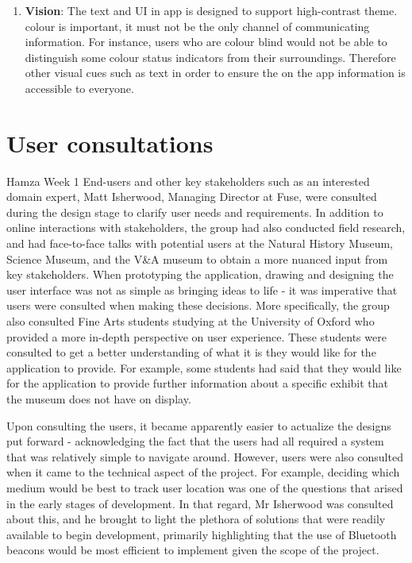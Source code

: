 \begin{enumerate}
	\item \textbf{Vision}: The text and UI in  app is designed to support high-contrast theme.   colour is important, it must not be the only channel of communicating information. For instance, users who are colour blind would not be able to distinguish some colour status indicators from their surroundings. Therefore  other visual cues such as text  in order to ensure the on the app information is accessible to everyone. 
    
\end{enumerate}

\section{User consultations}
Hamza Week 1
End-users and other key stakeholders such as an interested domain expert, Matt Isherwood, Managing Director at Fuse\textsuperscript{\textcopyright}, were consulted during the design stage to clarify user needs and requirements. In addition to online interactions with stakeholders, the group had also conducted field research, and had face-to-face talks with potential users at the Natural History Museum, Science Museum, and the V\&A museum to obtain a more nuanced input from key stakeholders. When prototyping the application, drawing and designing the user interface was not as simple as bringing ideas to life - it was imperative that users were consulted when making these decisions. More specifically, the group also consulted Fine Arts students studying at the University of Oxford who provided a more in-depth perspective on user experience. These students were consulted to get a better understanding of what it is they would like for the application to provide. For example, some students had said that they would like for the application to provide further information about a specific exhibit that the museum does not have on display.

Upon consulting the users, it became apparently easier to actualize the designs put forward - acknowledging the fact that the users had all required a system that was relatively simple to navigate around. However, users were also consulted when it came to the technical aspect of the project. For example, deciding which medium would be best to track user location was one of the questions that arised in the early stages of development. In that regard, Mr Isherwood was consulted about this, and he brought to light the plethora of solutions that were readily available to begin development, primarily highlighting that the use of Bluetooth beacons would be most efficient to implement given the scope of the project.